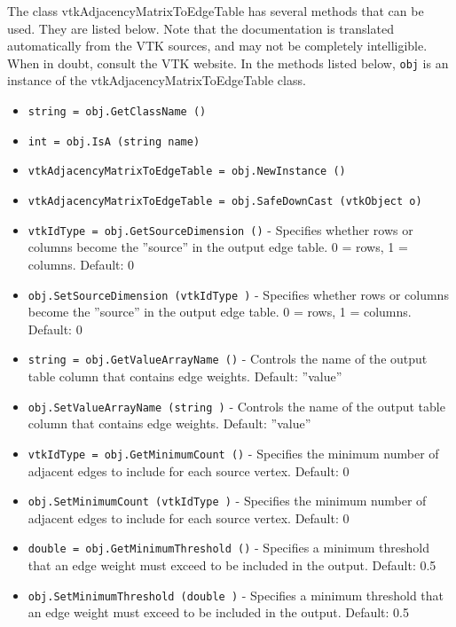 The class vtkAdjacencyMatrixToEdgeTable has several methods that can be used.
  They are listed below.
Note that the documentation is translated automatically from the VTK sources,
and may not be completely intelligible.  When in doubt, consult the VTK website.
In the methods listed below, \verb|obj| is an instance of the vtkAdjacencyMatrixToEdgeTable class.
\begin{itemize}
\item  \verb|string = obj.GetClassName ()|

\item  \verb|int = obj.IsA (string name)|

\item  \verb|vtkAdjacencyMatrixToEdgeTable = obj.NewInstance ()|

\item  \verb|vtkAdjacencyMatrixToEdgeTable = obj.SafeDownCast (vtkObject o)|

\item  \verb|vtkIdType = obj.GetSourceDimension ()| -  Specifies whether rows or columns become the ''source'' in the output edge table.
 0 = rows, 1 = columns.  Default: 0

\item  \verb|obj.SetSourceDimension (vtkIdType )| -  Specifies whether rows or columns become the ''source'' in the output edge table.
 0 = rows, 1 = columns.  Default: 0

\item  \verb|string = obj.GetValueArrayName ()| -  Controls the name of the output table column that contains edge weights.
 Default: ''value''

\item  \verb|obj.SetValueArrayName (string )| -  Controls the name of the output table column that contains edge weights.
 Default: ''value''

\item  \verb|vtkIdType = obj.GetMinimumCount ()| -  Specifies the minimum number of adjacent edges to include for each source vertex.
 Default: 0

\item  \verb|obj.SetMinimumCount (vtkIdType )| -  Specifies the minimum number of adjacent edges to include for each source vertex.
 Default: 0

\item  \verb|double = obj.GetMinimumThreshold ()| -  Specifies a minimum threshold that an edge weight must exceed to be included in
 the output.
 Default: 0.5

\item  \verb|obj.SetMinimumThreshold (double )| -  Specifies a minimum threshold that an edge weight must exceed to be included in
 the output.
 Default: 0.5

\end{itemize}
